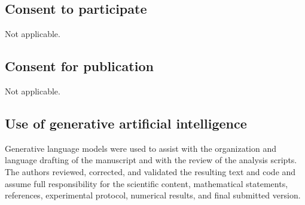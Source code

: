 \documentclass[pdflatex,sn-mathphys-num,iicol,oneside]{sn-jnl}
\begin{document}
\subsection*{Consent to participate}

Not applicable.

\subsection*{Consent for publication}

Not applicable.

\subsection*{Use of generative artificial intelligence}

Generative language models were used to assist with the organization
and language drafting of the manuscript and with the review of the
analysis scripts. The authors reviewed, corrected, and validated the
resulting text and code and assume full responsibility for the
scientific content, mathematical statements, references, experimental
protocol, numerical results, and final submitted version.



\end{document}
